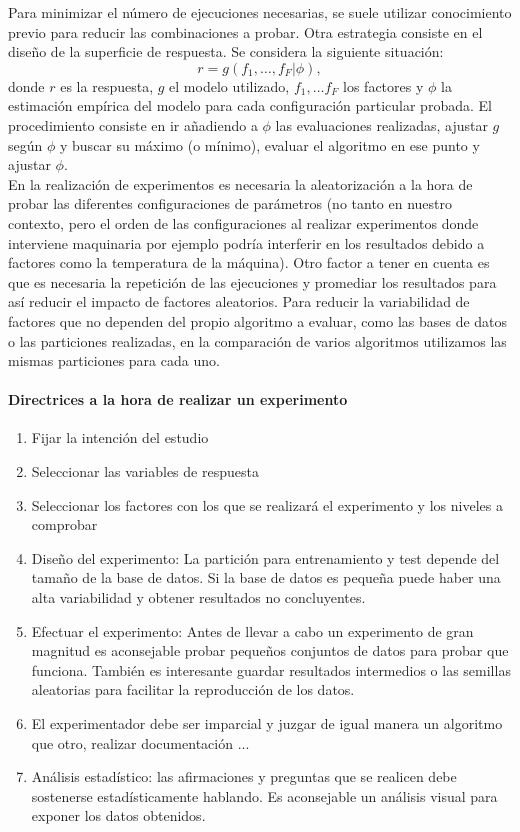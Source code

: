 	Para minimizar el número de ejecuciones necesarias, se 
suele utilizar conocimiento previo para reducir las 
combinaciones a probar. Otra estrategia consiste en el diseño 
de la superficie de respuesta. Se considera la siguiente 
situación:
		\[ r = g( f_1, \dots, f_F | \phi ), \]
	donde $r$ es la respuesta, $g$ el modelo utilizado, 
$f_1, \dots f_F$ los factores y $\phi$ la estimación empírica 
del modelo para cada configuración particular probada. El 
procedimiento consiste en ir añadiendo a $\phi$ las 
evaluaciones realizadas, ajustar $g$ según $\phi$ y buscar su 
máximo (o mínimo), evaluar el algoritmo en ese punto y 
ajustar $\phi$.\\
	En la realización de experimentos es necesaria la 
aleatorización a la hora de probar las diferentes 
configuraciones de parámetros (no tanto en nuestro contexto, 
pero el orden de las configuraciones al realizar experimentos 
donde interviene maquinaria por ejemplo podría interferir en los 
resultados debido a factores como la temperatura de la 
máquina). Otro factor a tener en cuenta es que es necesaria 
la repetición de las ejecuciones y promediar los resultados 
para así reducir el impacto de factores aleatorios. Para 
reducir la variabilidad de factores que no dependen del 
propio algoritmo a evaluar, como las bases de datos o las 
particiones realizadas, en la comparación de varios 
algoritmos utilizamos las mismas particiones para cada uno.

\paragraph{Directrices a la hora de realizar un experimento}
	\begin{enumerate}
	\item Fijar la intención del estudio
	\item Seleccionar las variables de respuesta
	\item Seleccionar los factores con los que se realizará 
		el experimento y los niveles a comprobar
	\item Diseño del experimento: La partición para 
		entrenamiento y test depende del tamaño de la base de 
		datos. Si la base de datos es pequeña puede haber una 
		alta variabilidad y obtener resultados no 
		concluyentes.
	\item Efectuar el experimento: Antes de llevar a cabo un 
		experimento de gran magnitud es aconsejable probar 
		pequeños conjuntos de datos para probar que funciona. 
		También es interesante guardar resultados intermedios 
		o las semillas aleatorias para facilitar la 
		reproducción de los datos.
	\item El experimentador debe ser imparcial y juzgar de 
		igual manera un algoritmo que otro, realizar 
		documentación ...
	\item Análisis estadístico: las afirmaciones y preguntas 
		que se realicen debe sostenerse estadísticamente 
		hablando. Es aconsejable un análisis visual para 
		exponer los datos obtenidos.
	\end{enumerate}
	

